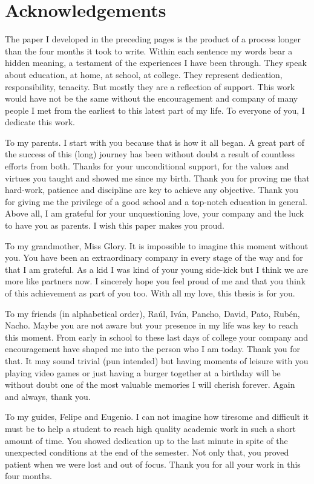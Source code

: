 \documentclass[english, a4paper, 12pt]{article}
\begin{document}
\newpage
\section*{Acknowledgements}
The paper I developed in the preceding pages is the product of a process longer than the four months it took to write. Within each sentence my words bear a hidden meaning, a testament of the experiences I have been through.  They speak about education, at home, at school, at college. They represent dedication, responsibility, tenacity. But mostly they are a reflection of support. This work would have not be the same without the encouragement and company of many people I met from the earliest to this latest part of my life. To everyone of you, I dedicate this work.

To my parents. I start with you because that is how it all began. A great part of the success of this (long) journey has been without doubt a result of countless efforts from both. Thanks for your unconditional support, for the values and virtues you taught and showed me since my birth. Thank you for proving me that hard-work, patience and discipline are key to achieve any objective. Thank you for giving me the privilege of a good school and a top-notch education in general. Above all, I am grateful for your unquestioning love, your company and the luck to have you as parents. I wish this paper makes you proud.

To my grandmother, Miss Glory. It is impossible to imagine this moment without you. You have been an extraordinary company in every stage of the way and for that I am grateful. As a kid I was kind of your young side-kick but I think we are more like partners now. I sincerely hope you feel proud of me and that you think of this achievement as part of you too. With all my love, this thesis is for you. 

To my friends (in alphabetical order), Raúl, Iván, Pancho, David, Pato, Rubén, Nacho. Maybe you are not aware but your presence in my life was key to reach this moment. From early in school to these last days of college your company and encouragement have shaped me into the person who I am today. Thank you for that. It may sound trivial (pun intended) but having moments of leisure with you playing video games or just having a burger together at a birthday will be without doubt one of the most valuable memories I will cherish forever. Again and always, thank you.

To my guides, Felipe and Eugenio. I can not imagine how tiresome and difficult it must be to help a student to reach high quality academic work in such a short amount of time. You showed dedication up to the last minute in spite of the unexpected conditions at the end of the semester. Not only that, you proved patient when we were lost and out of focus. Thank you for all your work in this four months.
\end{document}

